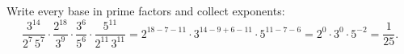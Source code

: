Write every base in prime factors and collect exponents:
\[\dfrac{3^{14}}{2^7\,5^7}\cdot\dfrac{2^{18}}{3^9}\cdot\dfrac{3^6}{5^6}\cdot\dfrac{5^{11}}{2^{11}\,3^{11}}=2^{18-7-11}\cdot3^{14-9+6-11}\cdot5^{11-7-6}=2^0\cdot3^0\cdot5^{-2}=\boxed{\dfrac1{25}}.\]
